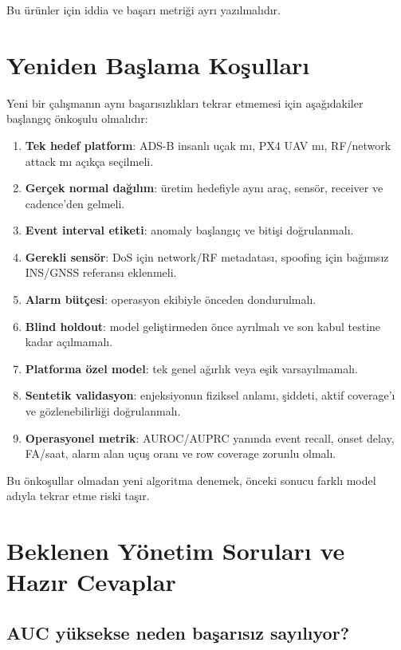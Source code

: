 \documentclass[11pt,a4paper,oneside]{report}
\begin{document}
Bu ürünler için iddia ve başarı metriği ayrı yazılmalıdır.

\chapter{Yeniden Başlama Koşulları}

Yeni bir çalışmanın aynı başarısızlıkları tekrar etmemesi için aşağıdakiler
başlangıç önkoşulu olmalıdır:

\begin{enumerate}
  \item \textbf{Tek hedef platform}: ADS-B insanlı uçak mı, PX4 UAV mı,
  RF/network attack mı açıkça seçilmeli.
  \item \textbf{Gerçek normal dağılım}: üretim hedefiyle aynı araç, sensör,
  receiver ve cadence'den gelmeli.
  \item \textbf{Event interval etiketi}: anomaly başlangıç ve bitişi
  doğrulanmalı.
  \item \textbf{Gerekli sensör}: DoS için network/RF metadatası, spoofing
  için bağımsız INS/GNSS referansı eklenmeli.
  \item \textbf{Alarm bütçesi}: operasyon ekibiyle önceden dondurulmalı.
  \item \textbf{Blind holdout}: model geliştirmeden önce ayrılmalı ve son
  kabul testine kadar açılmamalı.
  \item \textbf{Platforma özel model}: tek genel ağırlık veya eşik
  varsayılmamalı.
  \item \textbf{Sentetik validasyon}: enjeksiyonun fiziksel anlamı,
  şiddeti, aktif coverage'ı ve gözlenebilirliği doğrulanmalı.
  \item \textbf{Operasyonel metrik}: AUROC/AUPRC yanında event recall,
  onset delay, FA/saat, alarm alan uçuş oranı ve row coverage zorunlu olmalı.
\end{enumerate}

Bu önkoşullar olmadan yeni algoritma denemek, önceki sonucu farklı model
adıyla tekrar etme riski taşır.

\chapter{Beklenen Yönetim Soruları ve Hazır Cevaplar}

\section*{AUC yüksekse neden başarısız sayılıyor?}
\end{document}
